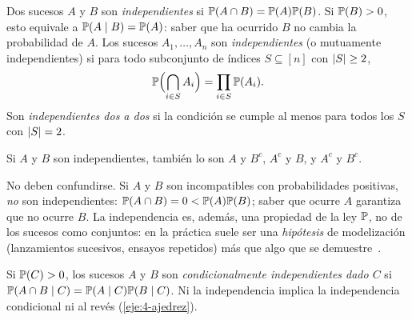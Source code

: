 \begin{definicion}[Independencia]
Dos sucesos $A$ y $B$ son \emph{independientes} si $\mathbb{P}(A\cap B)=\mathbb{P}(A)\mathbb{P}(B)$. Si $\mathbb{P}(B)>0$, esto equivale a $\mathbb{P}(A\mid B)=\mathbb{P}(A)$: saber que ha ocurrido $B$ no cambia la probabilidad de $A$. Los sucesos $A_1,\dots,A_n$ son \emph{independientes} (o mutuamente independientes) si para todo subconjunto de índices $S\subseteq[n]$ con $\lvert S\rvert\ge2$,
\[
\mathbb{P}\Bigl(\bigcap_{i\in S}A_i\Bigr)=\prod_{i\in S}\mathbb{P}(A_i).
\]
Son \emph{independientes dos a dos} si la condición se cumple al menos para todos los $S$ con $\lvert S\rvert=2$.
\end{definicion}

\begin{proposicion}\label{prop:t4-complementos}
Si $A$ y $B$ son independientes, también lo son $A$ y $B^{c}$, $A^{c}$ y $B$, y $A^{c}$ y $B^{c}$.
\end{proposicion}

\addtocounter{definicion}{1}%

\begin{observacion}
No deben confundirse. Si $A$ y $B$ son incompatibles con probabilidades positivas, \emph{no} son independientes: $\mathbb{P}(A\cap B)=0<\mathbb{P}(A)\mathbb{P}(B)$; saber que ocurre $A$ garantiza que no ocurre $B$. La independencia es, además, una propiedad de la ley $\mathbb{P}$, no de los sucesos como conjuntos: en la práctica suele ser una \emph{hipótesis} de modelización (lanzamientos sucesivos, ensayos repetidos) más que algo que se demuestre~\cite[§17.7.2]{mcs}.
\end{observacion}

Si $\mathbb{P}(C)>0$, los sucesos $A$ y $B$ son \emph{condicionalmente independientes dado $C$} si $\mathbb{P}(A\cap B\mid C)=\mathbb{P}(A\mid C)\mathbb{P}(B\mid C)$. Ni la independencia implica la independencia condicional ni al revés (\cref{eje:4-ajedrez}).

\addtocounter{definicion}{1}%

\addtocounter{definicion}{1}%

